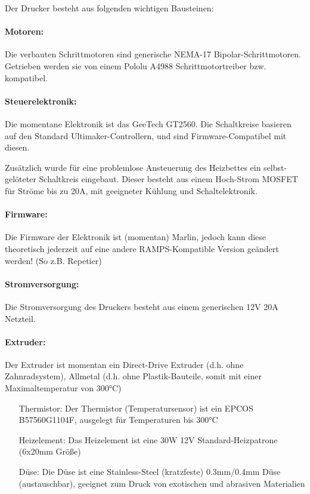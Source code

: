 Der Drucker besteht aus folgenden wichtigen Bausteinen: 

\paragraph{Motoren:} 
Die verbauten Schrittmotoren sind generische NEMA-17 Bipolar-Schrittmotoren. Getrieben werden sie von einem Pololu A4988 Schrittmotortreiber bzw. kompatibel.

\paragraph{Steuerelektronik:}
Die momentane Elektronik ist das GeeTech GT2560. Die Schaltkreise basieren auf den Standard Ultimaker-Controllern, und sind Firmware-Compatibel mit diesen.

Zusätzlich wurde für eine problemlose Ansteuerung des Heizbettes ein selbst-gelöteter Schaltkreis eingebaut.
Dieser besteht aus einem Hoch-Strom MOSFET für Ströme bis zu 20A, mit geeigneter Kühlung und Schaltelektronik.

\paragraph{Firmware:}
Die Firmware der Elektronik ist (momentan) Marlin, jedoch kann diese theoretisch jederzeit auf eine andere RAMPS-Kompatible Version geändert werden! (So z.B. Repetier)

\paragraph{Stromversorgung:}
Die Stromversorgung des Druckers besteht aus einem generischen 12V 20A Netzteil.

\paragraph{Extruder:}
Der Extruder ist momentan ein Direct-Drive Extruder (d.h. ohne Zahnradsystem), Allmetal (d.h. ohne Plastik-Bauteile, somit mit einer Maximaltemperatur von 300°C)
\begin{itemize}
\item[Thermistor:] Der Thermistor (Temperatursensor) ist ein EPCOS B57560G1104F, ausgelegt für Temperaturen bis 300°C
\item[Heizelement:] Das Heizelement ist eine 30W 12V Standard-Heizpatrone (6x20mm Größe)
\item[Düse:] Die Düse ist eine Stainless-Steel (kratzfeste) 0.3mm/0.4mm Düse (austauschbar), geeignet zum Druck von exotischen und abrasiven Materialien
\end{itemize}
